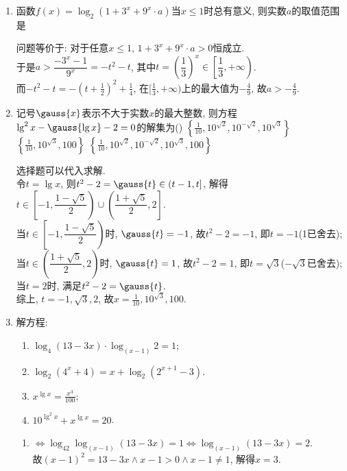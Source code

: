 \begin{enumerate}
    \item 函数$f(x)=\log_2(1+3^x+9^x\cdot a)$当$x\leq1$时总有意义, 则实数$a$的取值范围是
    \begin{jieda}
    问题等价于: 对于任意$x\leq 1$, $1+3^x+9^x\cdot a>0$恒成立. \\
    于是$a>\dfrac{-3^x-1}{9^x}=-t^2-t$, 其中$t=\left(\dfrac{1}{3}\right)^x\in\left[\dfrac{1}{3},+\infty\right)$. \\
    而$-t^2-t=-(t+\frac{1}{2})^2+\frac{1}{4}$, 在$[\frac{1}{3},+\infty)$上的最大值为$-\frac{4}{9}$, 故$a>-\frac{4}{9}$. 
    \end{jieda}

    \item 记号$\gauss{x}$表示不大于实数$x$的最大整数, 则方程$\lg^2x-\gauss{\lg{x}}-2=0$的解集为\dotfill()
    {$\left\{\frac{1}{10},10^{\sqrt{2}},10^{-\sqrt{2}},10^{\sqrt{3}}\right\}$}
    {$\left\{\frac{1}{10},10^{\sqrt{3}},100\right\}$}
    {$\left\{\frac{1}{10},10^{\sqrt{2}},10^{-\sqrt{2}},10^{\sqrt{3}},100\right\}$}
    \begin{jieda}
    选择题可以代入求解. \\
    令$t=\lg{x}$, 则$t^2-2=\gauss{t}\in(t-1,t]$, 解得$t\in\left[-1,\dfrac{1-\sqrt{5}}{2}\right)\cup\left(\dfrac{1+\sqrt{5}}{2},2\right]$. \\
    当$t\in\left[-1,\dfrac{1-\sqrt{5}}{2}\right)$时, $\gauss{t}=-1$, 故$t^2-2=-1$, 即$t=-1$(1已舍去); \\
    当$t\in\left(\dfrac{1+\sqrt{5}}{2},2\right)$时, $\gauss{t}=1$, 故$t^2-2=1$, 即$t=\sqrt{3}$($-\sqrt{3}$已舍去); \\
    当$t=2$时, 满足$t^2-2=\gauss{t}$. \\
    综上, $t=-1,\sqrt{3},2$, 故$x=\frac{1}{10},10^{\sqrt{3}},100$. 
    \end{jieda}

    \item 解方程: 
    \begin{enumerate}[(1)] 
    \item $\log_4(13-3x)\cdot\log_{(x-1)}2=1$; 
    \item $\log_2(4^x+4)=x+\log_2(2^{x+1}-3)$. 
    \item $x^{\lg{x}}=\frac{x^3}{100}$; 
    \item $10^{\lg^2x}+x^{\lg{x}}=20$. 
    \end{enumerate}
    \begin{jieda}
    \begin{enumerate}[(1)]
    \item $\iff\log_42\log_{(x-1)}(13-3x)=1\iff\log_{(x-1)}(13-3x)=2$. \\
    故$(x-1)^2=13-3x\land x-1>0\land x-1\neq 1$, 解得$x=3$. 
    

\end{enumerate}
\end{jieda}
\end{enumerate}
